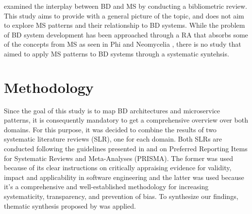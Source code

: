 \documentclass[a4paper,11pt,article,oneside]{memoir}
\begin{document}
\citet{staegemann2021examining} examined the interplay between BD and MS by conducting a bibliometric review. This study aims to provide with a general picture of the topic, and does not aim to explore MS patterns and their relationship to BD systems.  While the problem of BD system development has been approached through a RA that absorbs some of the concepts from MS as seen in Phi \citep{phi} and Neomycelia \citep{ataei2021neomycelia}, there is no study that aimed to apply MS patterns to BD systems through a systematic syntehsis.


\chapter{Methodology}

Since the goal of this study is to map BD architectures and microservice patterns, it is consequently mandatory to get a comprehensive overview over both domains. For this purpose, it was decided to combine the results of two systematic literature reviews (SLR), one for each domain. Both SLRs are conducted following the guidelines presented in \citet{Kitchenham.2004} and \citet{Page.2021} on Preferred Reporting Items for Systematic Reviews and Meta-Analyses (PRISMA). The former was used because of its clear instructions on critically appraising evidence for validity, impact and applicability in software engineering and the latter was used because it's a comprehensive and well-established methodology for increasing systematicity, transparency, and prevention of bias. To synthesize our findings, thematic synthesis proposed by \citet{Cruzes.2011} was applied. 





\end{document}
